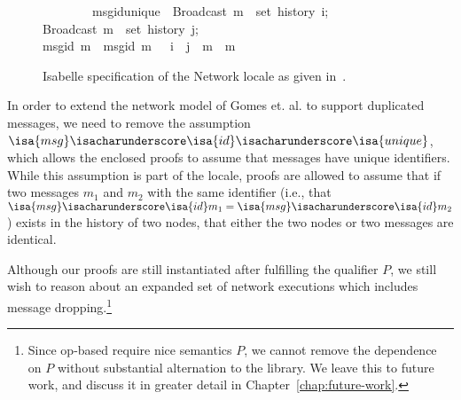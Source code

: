 \begin{figure}[H]
\begin{isabelle}
~~~~~~~~\>msg{\isacharunderscore}id{\isacharunderscore}unique{\isacharcolon}\ \>{\isasymlbrakk}\ \>{\isachardoublequoteopen}Broadcast\ m{}\ {\isasymin}\ set\ {\isacharparenleft}history\ i{\isacharparenright};\\
\>\>\>Broadcast\ m{}\ {\isasymin}\ set\ {\isacharparenleft}history\ j{\isacharparenright};\\
\>\>\>msg{\isacharunderscore}id\ m{}\ {\isacharequal}\ msg{\isacharunderscore}id\ m{}\ \>{\isasymrbrakk}\ {\isasymLongrightarrow}\ i\ {\isacharequal}\ j\ {\isasymand}\ m{}\ {\isacharequal}\ m{}{\isachardoublequoteclose}
\end{isabelle}
\centering
\caption{Isabelle specification of the Network locale as given
  in~\citep{gomes17}.}
\end{figure}

In order to extend the network model of Gomes et. al. to support duplicated
messages, we need to remove the assumption
$\isa{msg}\isacharunderscore\isa{id}\isacharunderscore\isa{unique}$, which
allows the enclosed proofs to assume that messages have unique identifiers.
While this assumption is part of the locale, proofs are allowed to assume that
if two messages $m_1$ and $m_2$ with the same identifier (i.e., that
$\isa{msg}\isacharunderscore\isa{id} m_1 = \isa{msg}\isacharunderscore\isa{id}
m_2$) exists in the history of two nodes, that either the two nodes or two
messages are identical.

Although our proofs are still instantiated after fulfilling the qualifier $P$,
we still wish to reason about an expanded set of network executions which
includes message dropping.\footnote{Since op-based \CRDTs require nice semantics
$P$, we cannot remove the dependence on $P$ without substantial alternation to
the library. We leave this to future work, and discuss it in greater detail in
Chapter~\ref{chap:future-work}.}

